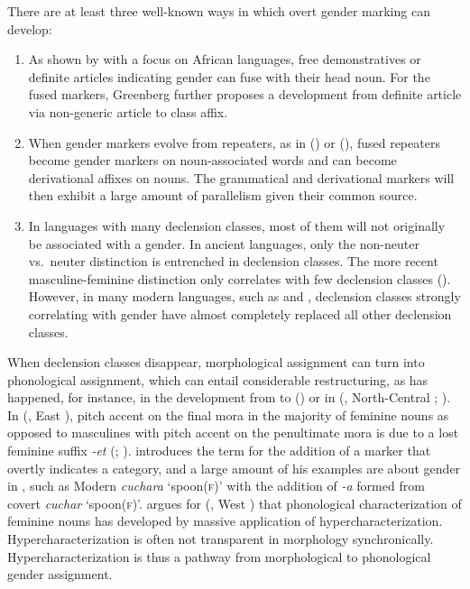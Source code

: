 \documentclass[output=collectionpaper]{langsci/langscibook}
\begin{document}
There are at least three well-known ways in which overt gender marking can develop:

\begin{enumerate}[label=(\roman*)]
\item As shown by \cite{Greenberg1978} with a focus on African languages, free demonstratives or definite articles indicating gender can fuse with their head noun. For the fused markers, Greenberg further proposes a development from definite article via non-generic article to class affix.
\item When gender markers evolve from repeaters, as in  (\citealt[278--279]{Grinevald2004}) or  (\citealt{Reid1997}), fused repeaters become gender markers on noun-associated words and can become derivational affixes on nouns. The grammatical and derivational markers will then exhibit a large amount of parallelism given their common source.
\item In languages with many declension classes, most of them will not originally be associated with a gender. In ancient  languages, only the non-neuter vs.\ neuter distinction is entrenched in declension classes. The more recent masculine-feminine distinction only correlates with few declension classes (\citealt[116--117]{Delbruck1883}). However, in many modern  languages, such as  and , declension classes strongly correlating with gender have almost completely replaced all other declension classes.
\end{enumerate}

When declension classes disappear, morphological assignment can turn into phonological assignment, which can entail considerable restructuring, as has happened, for instance, in the development from  to  (\citealt{Polinsky2003}) or in  (, North-Central ; \citealt[46]{Becher2001}). In  (, East ), pitch accent on the final mora in the majority of feminine nouns as opposed to masculines with pitch accent on the penultimate mora is due to a lost feminine suffix \textit{-et} (\citealt[46]{Oomen1981}; \citealt[102]{Corbett1991}). \cite{Malkiel1957-1958} introduces the term  for the addition of a marker that overtly indicates a category, and a large amount of his examples are about gender in , such as Modern  \textit{cuchara} `spoon(\textsc{f})' with the addition of \textit{-a} formed from covert  \textit{cuchar} `spoon(\textsc{f})'. \cite[202]{Newman1979} argues for  (, West ) that phonological characterization of feminine nouns has developed by massive application of hypercharacterization. Hypercharacterization is often not transparent in morphology synchronically. Hypercharacterization is thus a pathway from morphological to phonological gender assignment.
\end{document}
